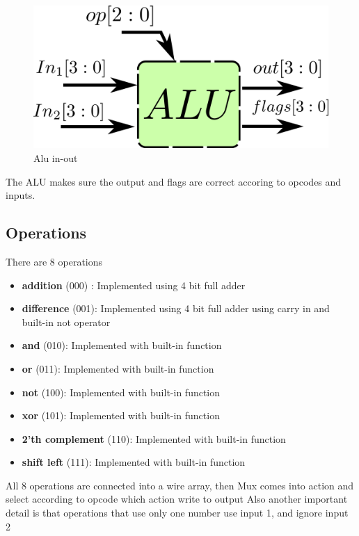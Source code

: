 \begin{figure}[H]
  \begin{centering}
  \includegraphics[scale=1]{data/alu.png}
  \par\end{centering}
  \caption{Alu in-out}
\end{figure}

The ALU makes sure the output and flags are correct accoring to opcodes and inputs.
\subsection*{Operations}
There are 8 operations
\begin{itemize}
  \item \textbf{addition} (000) : Implemented using 4 bit full adder
  \item \textbf{difference} (001): Implemented using 4 bit full adder using carry in and built-in not operator
  \item \textbf{and} (010): Implemented with built-in function
  \item \textbf{or} (011): Implemented with built-in function
  \item \textbf{not} (100): Implemented with built-in function
  \item \textbf{xor} (101): Implemented with built-in function
  \item \textbf{2'th complement} (110): Implemented with built-in function
  \item \textbf{shift left} (111): Implemented with built-in function
\end{itemize}

All 8 operations are connected into a wire array, then Mux comes into action and select according to opcode which action write to output
Also another important detail is that operations that use only one number use input 1, and ignore input 2

